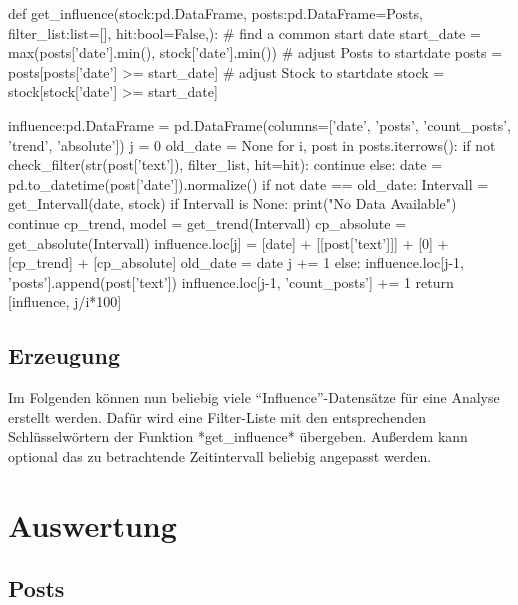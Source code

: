 \documentclass{article}
\begin{document}
\begin{python}
def get_influence(stock:pd.DataFrame, posts:pd.DataFrame=Posts, filter_list:list=[], hit:bool=False,):
    # find a common start date
    start_date = max(posts['date'].min(), stock['date'].min())
    # adjust Posts to startdate
    posts = posts[posts['date'] >= start_date]
    # adjust Stock to startdate
    stock = stock[stock['date'] >= start_date]

    influence:pd.DataFrame = pd.DataFrame(columns=['date', 'posts', 'count_posts', 'trend', 'absolute'])
    j = 0
    old_date = None
    for i, post in posts.iterrows():
        if not check_filter(str(post['text']), filter_list, hit=hit):
            continue
        else:
            date = pd.to_datetime(post['date']).normalize()
            if not date == old_date:
                Intervall = get_Intervall(date, stock)
                if Intervall is None:
                    print("No Data Available")
                    continue
                cp_trend, model = get_trend(Intervall)
                cp_absolute = get_absolute(Intervall)
                influence.loc[j] = [date] + [[post['text']]] + [0] + [cp_trend] + [cp_absolute]
                old_date = date
                j += 1
            else:
                influence.loc[j-1, 'posts'].append(post['text'])
                influence.loc[j-1, 'count_posts'] += 1
    return [influence, j/i*100]
\end{python}

\subsection{Erzeugung}
Im Folgenden können nun beliebig viele ``Influence''-Datensätze für eine Analyse erstellt werden.
Dafür wird eine Filter-Liste mit den entsprechenden Schlüsselwörtern der Funktion *get_influence* übergeben.
Außerdem kann optional das zu betrachtende Zeitintervall beliebig angepasst werden.


\newpage

\section{Auswertung}
\subsection{Posts}
\end{document}
